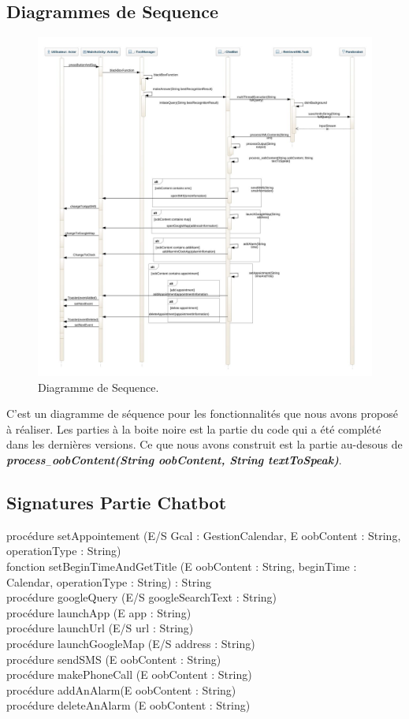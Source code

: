 \subsection{Diagrammes de Sequence}
\begin{figure}[ht]
\centering
\includegraphics[scale=0.4]{./diagrammes/SequenceDiagram.jpeg}
\caption{Diagramme de Sequence.\label{fig3}}
\end{figure}
\indent C'est un diagramme de séquence pour les fonctionnalités que nous avons proposé à réaliser. Les parties à la boite noire est la partie du code qui a été complété dans les dernières versions. Ce que nous avons construit est la partie au-desous de \textbf{\emph{process$_-$oobContent(String oobContent, String textToSpeak)}}.
\newpage

\subsection{Signatures Partie Chatbot}
procédure setAppointement (E/S Gcal : GestionCalendar, E oobContent : String, operationType : String)\\
\indent fonction setBeginTimeAndGetTitle (E oobContent : String, beginTime : Calendar, operationType : String) : String\\
\indent procédure googleQuery (E/S googleSearchText : String)\\
\indent procédure launchApp (E app : String)\\
\indent procédure launchUrl (E/S url : String)\\
\indent procédure launchGoogleMap (E/S address : String)\\
\indent procédure sendSMS (E oobContent : String)\\
\indent procédure makePhoneCall (E oobContent : String)\\
\indent procédure addAnAlarm(E oobContent : String)\\
\indent procédure deleteAnAlarm (E oobContent : String)\\

